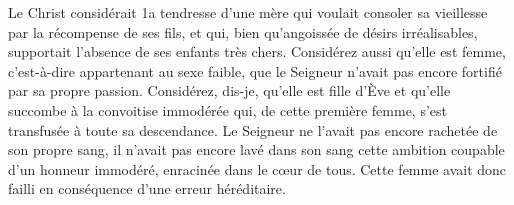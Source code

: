 Le Christ considérait 1a tendresse d’une mère qui voulait consoler sa vieillesse par la récompense de ses fils, et qui, bien qu’angoissée de désirs irréalisables, supportait l’absence de ses enfants très chers. Considérez aussi qu’elle est femme, c’est-à-dire appartenant au sexe faible, que le Seigneur n’avait pas encore fortifié par sa propre passion. Considérez, dis-je, qu’elle est fille d’Ève et qu’elle succombe à la convoitise immodérée qui, de cette première femme, s’est transfusée à toute sa descendance. Le Seigneur ne l’avait pas encore rachetée de son propre sang, il n’avait pas encore lavé dans son sang cette ambition coupable d’un honneur immodéré, enracinée dans le cœur de tous. Cette femme avait donc failli en conséquence d’une erreur héréditaire.
